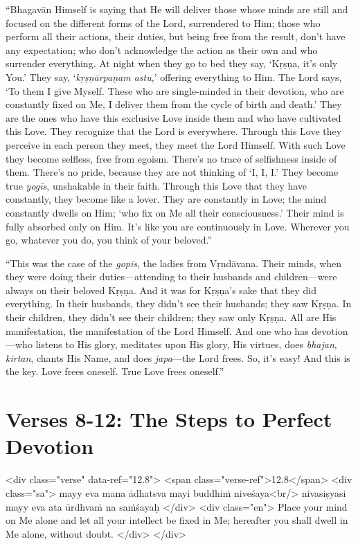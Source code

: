 \enquote{Bhagavān Himself is saying that He will deliver those whose minds are still and focused on the different forms of the Lord, surrendered to Him; those who perform all their actions, their duties, but being free from the result, don’t have any expectation; who don’t acknowledge the action as their own and who surrender everything. At night when they go to bed they say, \enquote{Kṛṣṇa, it’s only You.} They say, \enquote{\textit{kṛṣṇārpaṇam astu},} offering everything to Him. The Lord says, \enquote{To them I give Myself. These who are single-minded in their devotion, who are constantly fixed on Me, I deliver them from the cycle of birth and death.} They are the ones who have this exclusive Love inside them and who have cultivated this Love. They recognize that the Lord is everywhere. Through this Love they perceive in each person they meet, they meet the Lord Himself. With such Love they become selfless, free from egoism. There’s no trace of selfishness inside of them. There’s no pride, because they are not thinking of \enquote{I, I, I.} They become true \textit{yogīs}, unshakable in their faith. Through this Love that they have constantly, they become like a lover. They are constantly in Love; the mind constantly dwells on Him; \enquote{who fix on Me all their consciousness.} Their mind is fully absorbed only on Him. It’s like you are continuously in Love. Wherever you go, whatever you do, you think of your beloved.}

\enquote{This was the case of the \textit{gopīs}, the ladies from Vṛndāvana. Their minds, when they were doing their duties---attending to their husbands and children---were always on their beloved Kṛṣṇa. And it was for Kṛṣṇa's sake that they did everything. In their husbands, they didn’t see their husbands; they saw Kṛṣṇa. In their children, they didn’t see their children; they saw only Kṛṣṇa. All are His manifestation, the manifestation of the Lord Himself. And one who has devotion---who listens to His glory, meditates upon His glory, His virtues, does \textit{bhajan}, \textit{kīrtan}, chants His Name, and does \textit{japa}---the Lord frees. So, it’s easy! And this is the key. Love frees oneself. True Love frees oneself.}

\section{Verses 8-12: The Steps to Perfect Devotion}\label{sec-verses-8-12-the-steps-to-perfect-devotion}


\begin{html}
<div class="verse" data-ref="12.8">
  <span class="verse-ref">12.8</span>
  <div class="sa">
    mayy eva mana ādhatsva mayi buddhiṁ niveśaya<br/>
    nivasiṣyasi mayy eva ata ūrdhvaṁ na saṁśayaḥ
  </div>
  <div class="en">
    Place your mind on Me alone and let all your intellect be fixed in Me; hereafter you shall dwell in Me alone, without doubt.
  </div>
</div>
\end{html}



